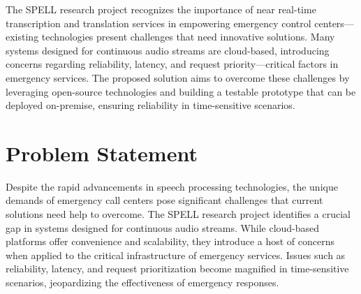 The SPELL research project recognizes the importance of near real-time transcription and translation services in empowering emergency control centers—existing technologies present challenges that need innovative solutions. 
Many systems designed for continuous audio streams are cloud-based, introducing concerns regarding reliability, 
latency, and request priority—critical factors in emergency services. The proposed solution aims to 
overcome these challenges by leveraging open-source technologies and building a testable prototype that can be deployed 
on-premise, ensuring reliability in time-sensitive scenarios.


\section{Problem Statement}


Despite the rapid advancements in speech processing technologies, the unique demands of emergency call centers pose 
significant challenges that current solutions need help to overcome. The SPELL research project identifies a crucial gap 
in systems designed for continuous audio streams. While cloud-based platforms offer convenience and 
scalability, they introduce a host of concerns when applied to the critical infrastructure of emergency services. 
Issues such as reliability, latency, and request prioritization become magnified in time-sensitive scenarios, 
jeopardizing the effectiveness of emergency responses.

